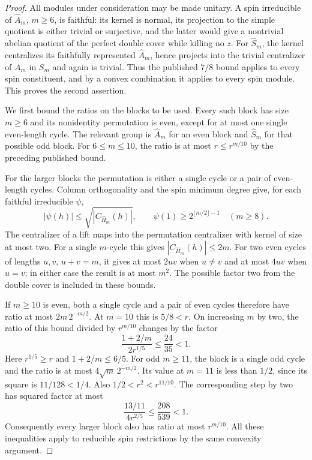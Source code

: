 \begin{proof}
All modules under consideration may be made unitary.  A spin
irreducible of $\widehat A_m$, $m\ge6$, is faithful: its kernel is
normal, its projection to the simple quotient is either trivial or
surjective, and the latter would give a nontrivial abelian quotient
of the perfect double cover while killing no $z$.  For
$\widehat S_m$, the kernel centralizes its faithfully represented
$\widehat A_m$, hence projects into the trivial centralizer of
$A_m$ in $S_m$ and again is trivial.  Thus the published $7/8$
bound applies to every spin constituent, and by a convex combination
it applies to every spin module.  This proves the second assertion.

We first bound the ratios on the blocks to be used.  Every such
block has size $m\ge6$ and its nonidentity permutation is even,
except for at most one single even-length cycle.  The relevant
group is $\widehat A_m$ for an even block and $\widehat S_m$ for
that possible odd block.  For $6\le m\le10$, the ratio is at most
$r\le r^{m/10}$ by the preceding published bound.

For the larger blocks the permutation is either a single cycle
or a pair of even-length cycles.  Column orthogonality and the
spin minimum degree give, for each faithful irreducible $\psi$,
\[
 |\psi(h)|\le\sqrt{|C_{\widehat H_m}(h)|},\qquad
 \psi(1)\ge2^{\lfloor m/2\rfloor-1}\quad(m\ge8).
 \tag{SPA.3}
\]
The centralizer of a lift maps into the permutation centralizer
with kernel of size at most two.  For a single $m$-cycle this
gives $|C_{\widehat H_m}(h)|\le2m$.  For two even cycles of
lengths $u,v$, $u+v=m$, it gives at most $2uv$ when $u\ne v$
and at most $4uv$ when $u=v$; in either case the result is at
most $m^2$.  The possible factor two from the double cover is
included in these bounds.

If $m\ge10$ is even, both a single cycle and a pair of even
cycles therefore have ratio at most $2m\,2^{-m/2}$.
At $m=10$ this is $5/8<r$.  On increasing $m$ by two, the
ratio of this bound divided by $r^{m/10}$ changes by the factor
\[
 \frac{1+2/m}{2r^{1/5}}\le\frac{24}{35}<1.
 \tag{SPA.4}
\]
Here $r^{1/5}\ge r$ and $1+2/m\le6/5$.
For odd $m\ge11$, the block is a single odd cycle and the
ratio is at most $4\sqrt m\,2^{-m/2}$.  Its value at $m=11$
is less than $1/2$, since its square is $11/128<1/4$.
Also $1/2<r^2<r^{11/10}$.  The corresponding step by two
has squared factor at most
\[
 \frac{13/11}{4r^{2/5}}\le\frac{208}{539}<1.
 \tag{SPA.5}
\]
Consequently every larger block also has ratio at most $r^{m/10}$.
All these inequalities apply to reducible spin restrictions by
the same convexity argument.


\end{proof}
